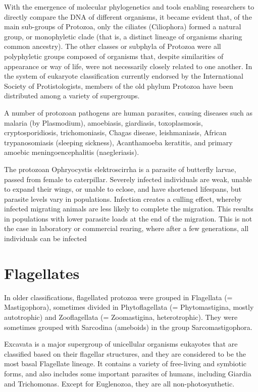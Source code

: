 With the emergence of molecular phylogenetics and tools enabling researchers to directly compare the DNA of different organisms, it became evident that, of the main sub-groups of Protozoa, only the ciliates (Ciliophora) formed a natural group, or monophyletic clade (that is, a distinct lineage of organisms sharing common ancestry). The other classes or subphyla of Protozoa were all polyphyletic groups composed of organisms that, despite similarities of appearance or way of life, were not necessarily closely related to one another. In the system of eukaryote classification currently endorsed by the International Society of Protistologists, members of the old phylum Protozoa have been distributed among a variety of supergroups.

A number of protozoan pathogens are human parasites, causing diseases such as malaria (by Plasmodium), amoebiasis, giardiasis, toxoplasmosis, cryptosporidiosis, trichomoniasis, Chagas disease, leishmaniasis, African trypanosomiasis (sleeping sickness), Acanthamoeba keratitis, and primary amoebic meningoencephalitis (naegleriasis).

The protozoan Ophryocystis elektroscirrha is a parasite of butterfly larvae, passed from female to caterpillar. Severely infected individuals are weak, unable to expand their wings, or unable to eclose, and have shortened lifespans, but parasite levels vary in populations. Infection creates a culling effect, whereby infected migrating animals are less likely to complete the migration. This results in populations with lower parasite loads at the end of the migration. This is not the case in laboratory or commercial rearing, where after a few generations, all individuals can be infected

\hypertarget{flagellates}{%
\section{Flagellates}\label{flagellates}}

In older classifications, flagellated protozoa were grouped in Flagellata (= Mastigophora), sometimes divided in Phytoflagellata (= Phytomastigina, mostly autotrophic) and Zooflagellata (= Zoomastigina, heterotrophic). They were sometimes grouped with Sarcodina (ameboids) in the group Sarcomastigophora.

Excavata is a major supergroup of unicellular organisms eukayotes that are classified based on their flagellar structures, and they are considered to be the most basal Flagellate lineage. It contains a variety of free-living and symbiotic forms, and also includes some important parasites of humans, including Giardia and Trichomonas. Except for Euglenozoa, they are all non-photosynthetic.

